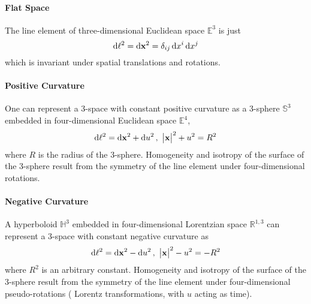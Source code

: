 \paragraph{Flat Space}

The line element of three-dimensional Euclidean space \(\mathbb{E}^{3}\) is just
%
\begin{equation}
	\dd{\ell^{2}}
	= \dd{\vb{x}^{2}}
	= \delta_{i j} \dd{x^{i}} \dd{x^{j}}
\end{equation}
%
which is invariant under spatial translations and rotations.

\paragraph{Positive Curvature}

One can represent a 3-space with constant positive curvature as a 3-sphere \(\mathbb{S}^{3}\) embedded in four-dimensional Euclidean space \(\mathbb{E}^{4}\),
%
\begin{equation}
	\dd{\ell^{2}}
	= \dd{\vb{x}^{2}} + \dd{u^{2}},\ \big\lvert\vb{x}\big\rvert^{2} + u^{2}
	= R^{2}
\end{equation}
%
where \(R\) is the radius of the 3-sphere.
Homogeneity and isotropy of the surface of the 3-sphere result from the symmetry of the line element under four-dimensional rotations.

\paragraph{Negative Curvature}

A hyperboloid \(\mathbb{H}^{3}\) embedded in four-dimensional Lorentzian space \(\mathbb{R}^{1,3}\) can represent a 3-space with constant negative curvature as
%
\begin{equation}
	\dd{\ell^{2}}
	= \dd{\vb{x}^{2}} - \dd{u^{2}},\ \big\lvert\vb{x}\big\rvert^{2} - u^{2}
	= -R^{2}
\end{equation}
%
where \(R^{2}\) is an arbitrary constant.
Homogeneity and isotropy of the surface of the 3-sphere result from the symmetry of the line element under four-dimensional pseudo-rotations (\ie{} Lorentz transformations, with \(u\) acting as time).

